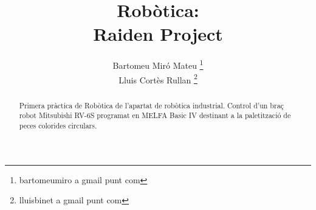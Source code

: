 \documentclass[a4paper,11pt]{scrartcl}
\title{Robòtica: \\ Raiden Project}
\author{ Bartomeu Miró Mateu \thanks{bartomeumiro a gmail punt com} \\
	 Lluis Cortès Rullan \thanks{lluisbinet a gmail punt com} }
\begin{document}
  \maketitle

  \begin{abstract}
    Primera pràctica de Robòtica de l'apartat de robòtica industrial.
    Control d'un braç robot Mitsubishi RV-6S programat en MELFA Basic IV
    destinant a la paletització de peces colorides circulars.
  \end{abstract}

  \newpage
  \setcounter{page}{2}
  \tableofcontents
  \newpage

  
  
  
  
  
\end{document}

